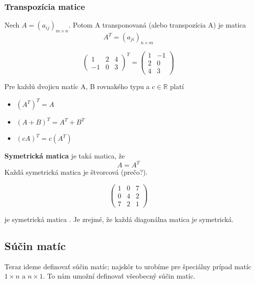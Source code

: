 \subsubsection{Transpozícia matice}
Nech $A = (a_{ij})_{m \times n}$. Potom A transponovaná (alebo transpozícia A) je matica
\[ A^T = (a_{ji})_{n \times m} \]
\begin{example}
\[ \begin{pmatrix} 1 & 2 & 4 \\ -1 & 0 & 3 \end{pmatrix}^T = \begin{pmatrix} 1 & -1 \\ 2 & 0 \\ 4 & 3 \end{pmatrix} \]
\end{example}

Pre každú dvojicu matíc A, B rovnakého typu a $c \in \mathbb{R}$ platí
\begin{itemize}
    \item $(A^T)^T = A$
    \item $(A + B)^T = A^T + B^T$
    \item $(cA)^T = c(A^T)$
\end{itemize}

\textbf{Symetrická matica} je taká matica, že
\[ A = A^T \]
Každá symetrická matica je štvorcová (prečo?). \\
\begin{example}
\[ \begin{pmatrix} 1 & 0 & 7 \\ 0 & 4 & 2 \\ 7 & 2 & 1 \end{pmatrix}\]
\end{example} 
je symetrická matica .
Je zrejmé, že každá diagonálna matica je symetrická.

\subsection{Súčin matíc}
Teraz ideme definovať súčin matíc; najskôr to urobíme pre špeciálny prípad matíc $1 \times n$ a $n \times 1$.
To nám umožní definovať všeobecný súčin matíc.

